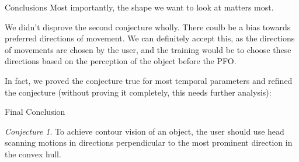 \documentclass[]{beamer}
\theoremstyle{remark}
\newtheorem{conjecture}[theorem]{Conjecture}
\begin{document}
\begin{frame}{Conclusions}
Most importantly, the shape we want to look at matters most. 

We didn't disprove the second conjecture wholly. There coulb be a bias towards preferred directions of movement. We can definitely accept this, as the directions of movements are chosen by the user, and the training would be to choose these directions based on the perception of the object before the PFO.

In fact, we proved the conjecture true for most temporal parameters and refined the conjecture (without proving it completely, this needs further analysis):

\end{frame}

\begin{frame}{Final Conclusion}
\begin{conjecture}
	To achieve contour vision of an object, the user should use head scanning motions in directions perpendicular to the most prominent direction in the convex hull.
\end{conjecture}
\end{frame}




\end{document}
